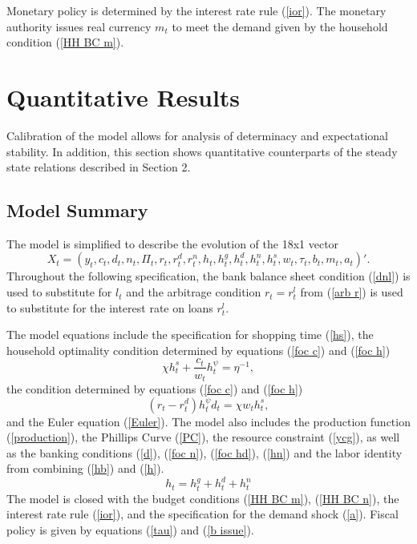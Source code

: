\documentclass[]{article}
\begin{document}
Monetary policy is determined by the interest rate rule (\ref{ior}). The monetary authority issues real currency $m_{t}$ to meet the demand given by the household condition (\ref{HH BC m}).

\section{Quantitative Results}

Calibration of the model allows for analysis of determinacy and expectational stability. In addition, this section shows quantitative counterparts of the steady state relations described in Section 2.

\subsection{Model Summary}

The model is simplified to describe the evolution of the 18x1 vector 
\[X_{t}=(y_{t},c_{t},d_{t},n_{t},\Pi_{t},r_{t},r^{d}_{t},r^{n}_{t},h_{t},h^{g}_{t},h^{d}_{t},h^{n}_{t},h^{s}_{t},w_{t},\tau_{t},b_{t},m_{t},a_{t})'. 
\]
Throughout the following specification, the bank balance sheet condition (\ref{dnl}) is used to substitute for $l_{t}$ and the arbitrage condition $r_{t}=r^{l}_{t}$ from (\ref{arb r}) is used to substitute for the interest rate on loans $r^{l}_{t}$.

The model equations include the specification for shopping time (\ref{hs}), the household optimality condition determined by equations (\ref{foc c}) and (\ref{foc h})
\begin{equation*}
    \chi h^{s}_{t}+\frac{c_{t}}{w_{t}}h_{t}^{\psi}=\eta^{-1},
\end{equation*}
the condition determined by equations (\ref{foc c}) and (\ref{foc h})
\begin{equation*}
    (r_{t}-r^{d}_{t})h_{t}^{\psi}d_{t}=  \chi w_{t}h^{s}_{t},
\end{equation*}
and the Euler equation (\ref{Euler}).
The model also includes the production function (\ref{production}), the Phillips Curve (\ref{PC}), the resource constraint (\ref{ycg}), as well as the banking conditions (\ref{d}), (\ref{foc n}), (\ref{foc hd}), (\ref{hn}) and the labor identity from combining (\ref{hb}) and (\ref{h}).
\begin{equation*}
    h_{t}=h^{g}_{t}+h^{d}_{t}+h^{n}_{t}
\end{equation*}
The model is closed with the budget conditions (\ref{HH BC m}), (\ref{HH BC n}), the interest rate rule (\ref{ior}), and the specification for the demand shock (\ref{a}). Fiscal policy is given by equations (\ref{tau}) and (\ref{b issue}).
\end{document}
